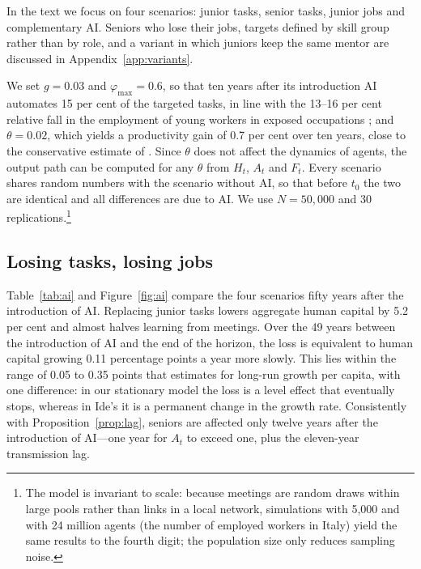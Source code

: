 \documentclass[preprint,12pt,authoryear]{elsarticle}
\begin{document}
In the text we focus on four scenarios: junior tasks, senior tasks, junior jobs and complementary AI. Seniors who lose their jobs, targets defined by skill group rather than by role, and a variant in which juniors keep the same mentor are discussed in Appendix~\ref{app:variants}.

We set $g=0.03$ and $\varphi_{\max}=0.6$, so that ten years after its introduction AI automates 15 per cent of the targeted tasks, in line with the 13--16 per cent relative fall in the employment of young workers in exposed occupations \citep{Brynjolfsson2025}; and $\theta=0.02$, which yields a productivity gain of 0.7 per cent over ten years, close to the conservative estimate of \citet{Acemoglu2024}. Since $\theta$ does not affect the dynamics of agents, the output path can be computed for any $\theta$ from $H_t$, $A_t$ and $F_t$. Every scenario shares random numbers with the scenario without AI, so that before $t_0$ the two are identical and all differences are due to AI. We use $N=50{,}000$ and 30 replications.\footnote{The model is invariant to scale: because meetings are random draws within large pools rather than links in a local network, simulations with 5{,}000 and with 24 million agents (the number of employed workers in Italy) yield the same results to the fourth digit; the population size only reduces sampling noise.}

\subsection{Losing tasks, losing jobs}

Table~\ref{tab:ai} and Figure~\ref{fig:ai} compare the four scenarios fifty years after the introduction of AI. Replacing junior tasks lowers aggregate human capital by 5.2 per cent and almost halves learning from meetings. Over the 49 years between the introduction of AI and the end of the horizon, the loss is equivalent to human capital growing 0.11 percentage points a year more slowly. This lies within the range of 0.05 to 0.35 points that \citet{Ide2026} estimates for long-run growth per capita, with one difference: in our stationary model the loss is a level effect that eventually stops, whereas in Ide's it is a permanent change in the growth rate. Consistently with Proposition~\ref{prop:lag}, seniors are affected only twelve years after the introduction of AI---one year for $A_t$ to exceed one, plus the eleven-year transmission lag.
\end{document}
